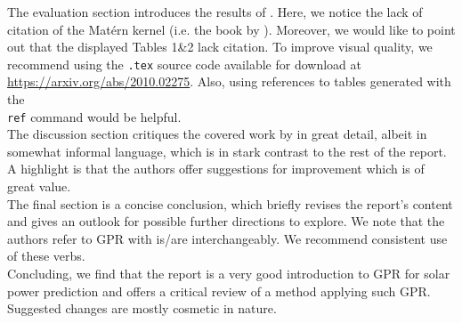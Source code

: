 \documentclass{article} %
\begin{document}
The evaluation section introduces the results of \citet{lawati2020short}. Here, we notice the lack of citation of the Matérn kernel (i.e. the book by \citet{rasmussen2003gaussian}). Moreover, we would like to point out that the displayed Tables 1\&2 lack citation. To improve visual quality, we recommend using the \texttt{.tex} source code available for download at \url{https://arxiv.org/abs/2010.02275}. Also, using references to tables generated with the \texttt{\\ref} command would be helpful.\\
The discussion section critiques the covered work by \citet{lawati2020short} in great detail, albeit in somewhat informal language, which is in stark contrast to the rest of the report. A highlight is that the authors offer suggestions for improvement which is of great value.\\
The final section is a concise conclusion, which briefly revises the report's content and gives an outlook for possible further directions to explore. We note that the authors refer to GPR with is/are interchangeably. We recommend consistent use of these verbs.\\
Concluding, we find that the report is a very good introduction to GPR for solar power prediction and offers a critical review of a method applying such GPR. Suggested changes are mostly cosmetic in nature.






\end{document}
